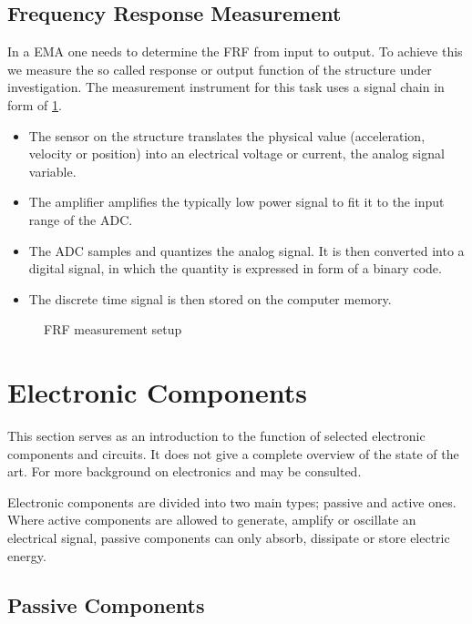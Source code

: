 \subsection{Frequency Response Measurement}

In a \ac{EMA} one needs to determine the \ac{FRF} from input to output. To achieve this we measure the so called response or output function of the structure under investigation. The measurement instrument for this task uses a signal chain in form of \ref{fig:measurement}.
\begin{itemize}
    \item The sensor on the structure translates the physical value (acceleration, velocity or position) into an electrical voltage or current, the analog signal variable.
    \item The amplifier amplifies the typically low power signal to fit it to the input range of the \ac{ADC}.
    \item The \ac{ADC} samples and quantizes the analog signal. It is then converted into a digital signal, in which the quantity is expressed in form of a binary code.
    \item The discrete time signal is then stored on the computer memory.
\end{itemize}
\cite{fu2001modal}

\begin{figure}[!htb]
    \centering
    
    \caption[Frequency Response Measurement]{\ac{FRF} measurement setup}
    \label{fig:measurement}
\end{figure}

\section{Electronic Components}

This section serves as an introduction to the function of selected electronic components and circuits. It does not give a complete overview of the state of the art. For more background on electronics \cite{Stiny2019AeB} and \cite{Tietze2008EC} may be consulted.

Electronic components are divided into two main types; passive and active ones. Where active components are allowed to generate, amplify or oscillate an electrical signal, passive components can only absorb, dissipate or store electric energy.

\subsection{Passive Components}


